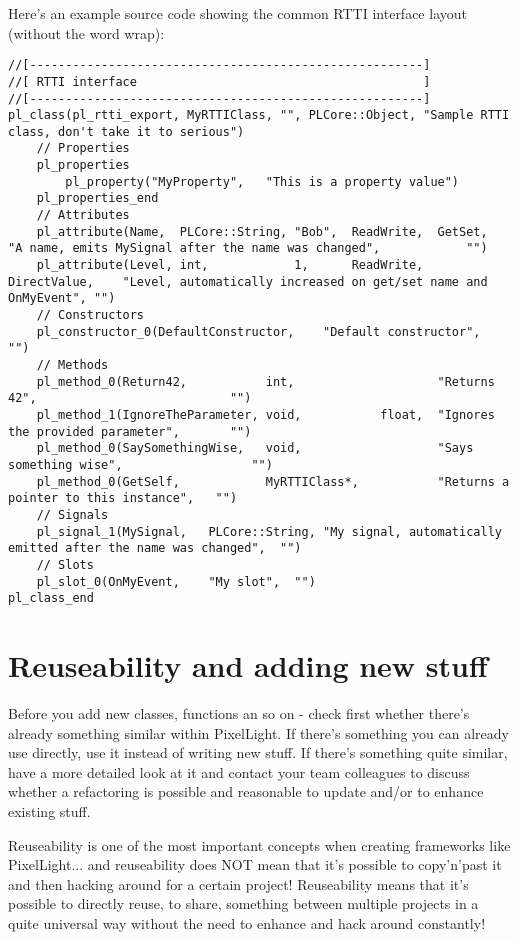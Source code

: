 Here's an example source code showing the common RTTI interface layout (without the word wrap):
\begin{lstlisting}[caption=RTTI interface (without the word wrap)]
//[-------------------------------------------------------]
//[ RTTI interface                                        ]
//[-------------------------------------------------------]
pl_class(pl_rtti_export, MyRTTIClass, "", PLCore::Object, "Sample RTTI class, don't take it to serious")
	// Properties
	pl_properties
		pl_property("MyProperty",	"This is a property value")
	pl_properties_end
	// Attributes
	pl_attribute(Name,	PLCore::String,	"Bob",	ReadWrite,	GetSet,			"A name, emits MySignal after the name was changed",			"")
	pl_attribute(Level,	int,			1,		ReadWrite,	DirectValue,	"Level, automatically increased on get/set name and OnMyEvent",	"")
	// Constructors
	pl_constructor_0(DefaultConstructor,	"Default constructor",	"")
	// Methods
	pl_method_0(Return42,			int,					"Returns 42",							"")
	pl_method_1(IgnoreTheParameter,	void,			float,	"Ignores the provided parameter",		"")
	pl_method_0(SaySomethingWise,	void,					"Says something wise",					"")
	pl_method_0(GetSelf,			MyRTTIClass*,			"Returns a pointer to this instance",	"")
	// Signals
	pl_signal_1(MySignal,	PLCore::String,	"My signal, automatically emitted after the name was changed",	"")
	// Slots
	pl_slot_0(OnMyEvent,	"My slot",	"")
pl_class_end
\end{lstlisting}



\section{Reuseability and adding new stuff}
Before you add new classes, functions an so on - check first whether there's already something similar within PixelLight. If there's something you can already use directly, use it instead of writing new stuff. If there's something quite similar, have a more detailed look at it and contact your team colleagues to discuss whether a refactoring is possible and reasonable to update and/or to enhance existing stuff.

Reuseability is one of the most important concepts when creating frameworks like PixelLight... and reuseability does NOT mean that it's possible to copy'n'past it and then hacking around for a certain project! Reuseability means that it's possible to directly reuse, to share, something between multiple projects in a quite universal way without the need to enhance and hack around constantly!
